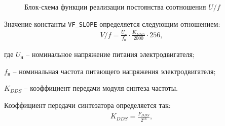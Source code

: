         \begin{figure}[ph!]
            \caption{Блок-схема функции реализации постоянства соотношения $U/f$}
            \label{fig:bs-vf}
        \end{figure}
        
        Значение константы \verb"VF_SLOPE" определяется следующим отношением:
        \begin{gather*}
            V/f = \frac{U_\text{н}}{f_\text{н}} \cdot \frac{K_{DDS}}{2000} \cdot 256,
        \end{gather*}

        где $U_\text{н}$ -- номинальное напряжение питания электродвигателя;\par
        $f_\text{н}$ -- номинальная частота питающего напряжения электродвигателя;\par
        $K_{DDS}$ -- коэффициент передачи модуля синтеза частоты.

        Коэффициент передачи синтезатора определяется так:
        \begin{gather*}
            K_{DDS} = \frac{F_{DDS}}{2^{16}},
        \end{gather*}

